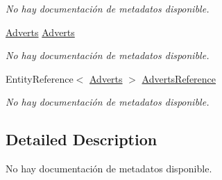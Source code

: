 \begin{DoxyCompactItemize}
\begin{DoxyCompactList}\small\item\em No hay documentación de metadatos disponible. \end{DoxyCompactList}\item 
\hyperlink{class_microsoft_1_1_samples_1_1_kinect_1_1_basic_interactions_1_1_adverts}{Adverts} \hyperlink{class_microsoft_1_1_samples_1_1_kinect_1_1_basic_interactions_1_1_advert_campaign_detail_interactions_a1978aca6a4045d904102d4ec3c67f882}{Adverts}
\begin{DoxyCompactList}\small\item\em No hay documentación de metadatos disponible. \end{DoxyCompactList}\item 
Entity\-Reference$<$ \hyperlink{class_microsoft_1_1_samples_1_1_kinect_1_1_basic_interactions_1_1_adverts}{Adverts} $>$ \hyperlink{class_microsoft_1_1_samples_1_1_kinect_1_1_basic_interactions_1_1_advert_campaign_detail_interactions_aafd234fdd7a4738fc7903ad2c09e72cf}{Adverts\-Reference}
\begin{DoxyCompactList}\small\item\em No hay documentación de metadatos disponible. \end{DoxyCompactList}\end{DoxyCompactItemize}


\subsection{Detailed Description}
No hay documentación de metadatos disponible. 



